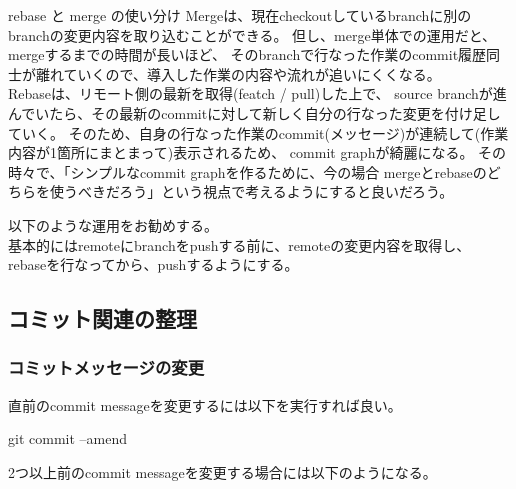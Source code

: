 \documentclass[10pt,a4j,openany,dvipdfmx]{jsarticle}
\begin{document}
\begin{oceanbox}{rebase と merge の使い分け}
Mergeは、現在checkoutしているbranchに別のbranchの変更内容を取り込むことができる。
但し、merge単体での運用だと、mergeするまでの時間が長いほど、
そのbranchで行なった作業のcommit履歴同士が離れていくので、導入した作業の内容や流れが追いにくくなる。\\
Rebaseは、リモート側の最新を取得(featch / pull)した上で、
source branchが進んでいたら、その最新のcommitに対して新しく自分の行なった変更を付け足していく。
そのため、自身の行なった作業のcommit(メッセージ)が連続して(作業内容が1箇所にまとまって)表示されるため、
commit graphが綺麗になる。
\tcblower
その時々で、「シンプルなcommit graphを作るために、今の場合
mergeとrebaseのどちらを使うべきだろう」という視点で考えるようにすると良いだろう。
\end{oceanbox}

以下のような運用をお勧めする。\\
基本的にはremoteにbranchをpushする前に、remoteの変更内容を取得し、
rebaseを行なってから、pushするようにする。




\subsection{コミット関連の整理} %
\label{sub:コミット関連の整理}


\subsubsection{コミットメッセージの変更} %
\label{ssub:コミットメッセージの変更}

直前のcommit messageを変更するには以下を実行すれば良い。
\begin{commandshell}
git commit --amend
\end{commandshell}

2つ以上前のcommit messageを変更する場合には以下のようになる。
\end{document}
